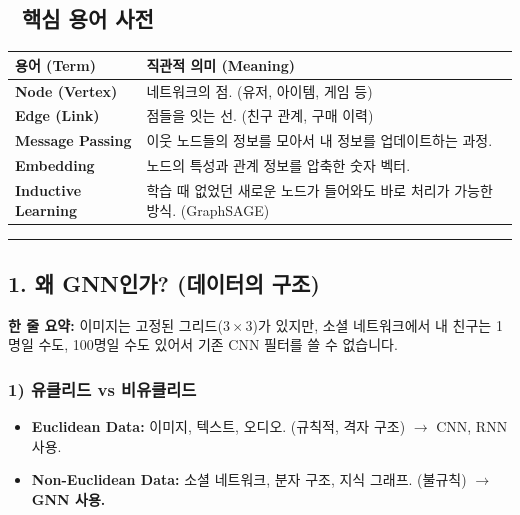 \documentclass[11pt,a4paper]{book}
\theoremstyle{definition}
\begin{document}
\subsection*{📝 핵심 용어 사전}
\begin{table}[h]
\centering
\begin{tabularx}{\textwidth}{|p{}|X|}
\hline
\textbf{용어 (Term)} & \textbf{직관적 의미 (Meaning)} \\
\hline
\textbf{Node (Vertex)} & 네트워크의 점. (유저, 아이템, 게임 등) \\
\hline
\textbf{Edge (Link)} & 점들을 잇는 선. (친구 관계, 구매 이력) \\
\hline
\textbf{Message Passing} & 이웃 노드들의 정보를 모아서 내 정보를 업데이트하는 과정. \\
\hline
\textbf{Embedding} & 노드의 특성과 관계 정보를 압축한 숫자 벡터. \\
\hline
\textbf{Inductive Learning} & 학습 때 없었던 새로운 노드가 들어와도 바로 처리가 가능한 방식. (GraphSAGE) \\
\hline
\end{tabularx}
\end{table}

\vspace{0.5cm}\hrule\vspace{0.5cm}

\subsection{1. 왜 GNN인가? (데이터의 구조)}

\begin{conceptbox}[title={개념 1: 줄을 설 수 없는 데이터}]
\textbf{한 줄 요약:} 이미지는 고정된 그리드($3 \times 3$)가 있지만, 소셜 네트워크에서 내 친구는 1명일 수도, 100명일 수도 있어서 기존 CNN 필터를 쓸 수 없습니다.
\end{conceptbox}

\subsubsection*{1) 유클리드 vs 비유클리드}
\begin{itemize}
    \item \textbf{Euclidean Data:} 이미지, 텍스트, 오디오. (규칙적, 격자 구조) $\rightarrow$ CNN, RNN 사용.
    \item \textbf{Non-Euclidean Data:} 소셜 네트워크, 분자 구조, 지식 그래프. (불규칙) $\rightarrow$ \textbf{GNN 사용.}
\end{itemize}
\end{document}

